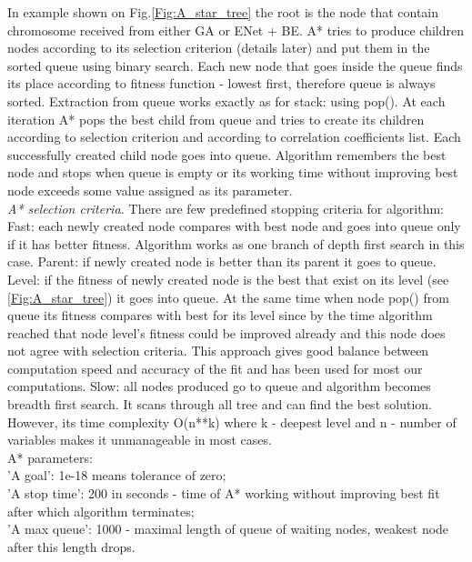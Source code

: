 \documentclass[aps,prl,reprint,amsmath,amssymb,nature]{revtex4-1}
\begin{document}
In example shown on Fig.\ref{Fig:A_star_tree} the root is the node that contain chromosome received from either GA or ENet + BE. A* tries to produce children nodes according to its selection criterion (details later) and put them in the sorted queue using binary search. Each new node that goes inside the queue finds its place according to fitness function - lowest first, therefore queue is always sorted. Extraction from queue works exactly as for stack: using pop(). At each iteration A* pops the best child from queue and tries to create its children according to selection criterion and according to correlation coefficients list. Each successfully created child node goes into queue. Algorithm remembers the best node and stops when queue is empty or its working time without improving best node exceeds some value assigned as its parameter.\\
\textit{A* selection criteria.} There are few predefined stopping criteria for algorithm:
Fast: each newly created node compares with best node and goes into queue only if it has better fitness. Algorithm works as one branch of depth first search in this case.
Parent: if newly created node is better than its parent it goes to queue.
Level: if the fitness of newly created node is the best that exist on its level (see \ref{Fig:A_star_tree}) it goes into queue. At the same time when node pop() from queue its fitness compares with best for its level since by the time algorithm reached that node level's fitness could be improved already and this node does not agree with selection criteria. This approach gives good balance between computation speed and accuracy of the fit and has been used for most our computations.
Slow: all nodes produced go to queue and algorithm becomes breadth first search. It scans through all tree and can find the best solution. However, its time complexity O(n**k) where k - deepest level and n - number of variables makes it unmanageable in most cases. \\
A* parameters:\\
'A goal': 1e-18 means tolerance of zero; \\
'A stop time': 200 in seconds - time of A* working without improving best fit after which algorithm terminates;\\
'A max queue': 1000 - maximal length of queue of waiting nodes, weakest node after this length drops.\\

\old

\red
\end{document}
